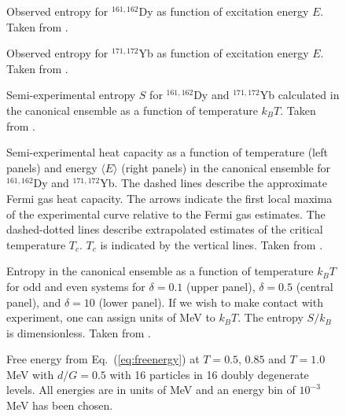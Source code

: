 \documentclass[rmp,preprint,aps,floatfix]{revtex4}
\begin{document}
\begin{figure}
\caption{Observed entropy for $^{161,162}$Dy as 
function of excitation energy $E$. Taken from \cite{entropy2000}.}
\label{fig:fig7_sec3}
\end{figure}
\begin{figure}
\caption{Observed entropy for $^{171,172}$Yb as function 
of excitation energy $E$. Taken from \cite{entropy2000}.}
\label{fig:fig8_sec3}
\end{figure}

\begin{figure}
\caption{Semi-experimental entropy 
$S$ for $^{161,162}$Dy and $^{171,172}$Yb calculated in 
the canonical ensemble as a 
function of temperature $k_BT$. Taken from \cite{entropy2000}.}
\label{fig:fig10_sec3}
\end{figure}

\begin{figure}\centering
\caption{Semi-experimental heat capacity as a function of temperature (left 
panels) and energy $\langle E\rangle$ (right panels) in the canonical ensemble 
for $^{161,162}$Dy and $^{171,172}$Yb. The dashed lines describe the 
approximate Fermi gas heat capacity. The arrows indicate the first local 
maxima of the experimental curve relative to the Fermi gas estimates. The 
dashed-dotted lines describe extrapolated estimates of 
the critical temperature $T_c$. $T_c$ is indicated
by the vertical lines. 
Taken from \cite{schiller2001}.}
\label{fig:heatcapacity} 
\end{figure}

\begin{figure}
\caption{Entropy in the canonical ensemble as a function 
of temperature $k_BT$ for odd and even systems for $\delta=0.1$ 
(upper panel), $\delta=0.5$ (central panel),
and $\delta=10$ (lower panel).
If we wish to make contact with experiment, one can assign units 
of MeV to $k_BT$.  The entropy $S/k_B$ is dimensionless. Taken from \cite{entropy2000}.
} 
\label{fig:fig5_sec3}
\end{figure}

\begin{figure}
\caption{Free energy from Eq.~(\ref{eq:freenergy}) at $T=0.5$, $0.85$ and
         $T=1.0$ MeV  with 
         $d/G=0.5$ with 16 particles in 16 doubly degenerate
         levels. All energies are in units of MeV and 
         an energy bin of $10^{-3}$ MeV has been chosen.}
\label{fig:free_energy16}
\end{figure}
\end{document}
